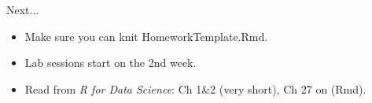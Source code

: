 \documentclass[10pt]{beamer}
\begin{document}
\begin{frame}{Next...}
\large
\begin{itemize}
    \item Make sure you can knit HomeworkTemplate.Rmd.
    \item Lab sessions start on the 2nd week.
    \item Read from {\em R for Data Science}: Ch 1\&2 (very short), Ch 27 on (Rmd).
\end{itemize}
    
\end{frame}
\end{document}
